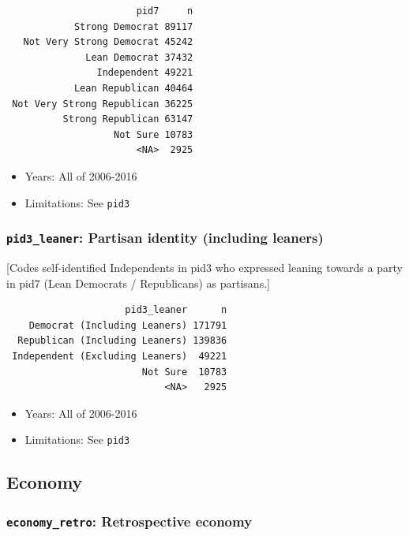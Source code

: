 \documentclass[10pt,article,oneside]{memoir}
\theoremstyle{definition}
\begin{document}
\begin{verbatim}
                       pid7     n
            Strong Democrat 89117
   Not Very Strong Democrat 45242
              Lean Democrat 37432
                Independent 49221
            Lean Republican 40464
 Not Very Strong Republican 36225
          Strong Republican 63147
                   Not Sure 10783
                       <NA>  2925
\end{verbatim}

\begin{itemize}
\tightlist
\item
  Years: All of 2006-2016
\item
  Limitations: See \texttt{pid3}
\end{itemize}

\subsubsection{\texorpdfstring{\texttt{pid3\_leaner}: Partisan identity
(including
leaners)}{pid3\_leaner: Partisan identity (including leaners)}}\label{pid3_leaner-partisan-identity-including-leaners}

{[}Codes self-identified Independents in pid3 who expressed leaning
towards a party in pid7 (Lean Democrats / Republicans) as partisans.{]}

\begin{verbatim}
                     pid3_leaner      n
    Democrat (Including Leaners) 171791
  Republican (Including Leaners) 139836
 Independent (Excluding Leaners)  49221
                        Not Sure  10783
                            <NA>   2925
\end{verbatim}

\begin{itemize}
\tightlist
\item
  Years: All of 2006-2016
\item
  Limitations: See \texttt{pid3}
\end{itemize}

\subsection{Economy}\label{economy}

\subsubsection{\texorpdfstring{\texttt{economy\_retro}: Retrospective
economy}{economy\_retro: Retrospective economy}}\label{economy_retro-retrospective-economy}
\end{document}
